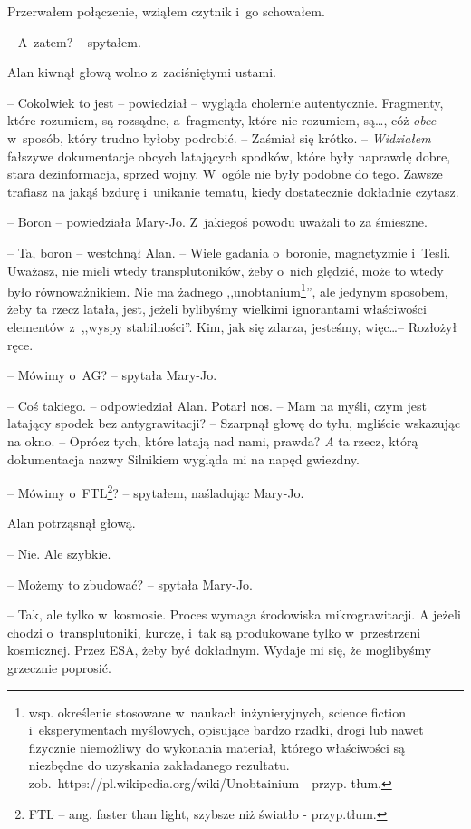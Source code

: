 \documentclass[oneside,polish,12pt,sfheadings]{mwbk}
\begin{document}
Przerwałem połączenie, wziąłem czytnik i~go schowałem.

-- A~zatem? -- spytałem.

Alan kiwnął głową wolno z~zaciśniętymi ustami.

-- Cokolwiek to jest -- powiedział -- wygląda cholernie autentycznie.
Fragmenty, które rozumiem, są rozsądne, a~fragmenty, które nie rozumiem,
są\ldots, cóż \emph{obce} w~sposób, który trudno byłoby podrobić. -- Zaśmiał
się krótko. -- \emph{Widziałem} fałszywe dokumentacje obcych latających
spodków, które były naprawdę dobre, stara dezinformacja, sprzed wojny. W~ogóle nie były podobne do tego. Zawsze trafiasz na jakąś bzdurę i~unikanie tematu, kiedy dostatecznie dokładnie czytasz.

-- Boron -- powiedziała Mary-Jo. Z~jakiegoś powodu uważali to za śmieszne.

-- Ta, boron -- westchnął Alan. -- Wiele gadania o~boronie, magnetyzmie i~Tesli. Uważasz, nie mieli wtedy transplutoników, żeby o~nich ględzić,
może to wtedy było równoważnikiem. Nie ma żadnego
,,unobtanium\footnote{wsp. określenie stosowane w~naukach
inżynieryjnych, science fiction i~eksperymentach myślowych, opisujące
bardzo rzadki, drogi lub nawet fizycznie niemożliwy do wykonania
materiał, którego właściwości są niezbędne do uzyskania zakładanego
rezultatu. zob.~https://pl.wikipedia.org/wiki/Unobtainium - przyp.
tłum.}'', ale jedynym sposobem, żeby ta rzecz latała, jest, jeżeli
bylibyśmy wielkimi ignorantami właściwości elementów z~,,wyspy
stabilności''. Kim, jak się zdarza, jesteśmy, więc\ldots -- Rozłożył ręce.

-- Mówimy o~AG? -- spytała Mary-Jo.

-- Coś takiego. -- odpowiedział Alan. Potarł nos. -- Mam na myśli, czym
jest latający spodek bez antygrawitacji? -- Szarpnął głowę do tyłu,
mgliście wskazując na okno. -- Oprócz tych, które latają nad nami,
prawda? \emph{A} ta rzecz, którą dokumentacja nazwy Silnikiem wygląda mi
na napęd gwiezdny.

-- Mówimy o~FTL\footnote{FTL -- ang. faster than light,
szybsze niż światło - przyp.tłum.}? -- spytałem, naśladując Mary-Jo.

Alan potrząsnął głową. 

-- Nie. Ale szybkie.

-- Możemy to zbudować? -- spytała Mary-Jo.

-- Tak, ale tylko w~kosmosie. Proces wymaga środowiska mikrograwitacji. A
jeżeli chodzi o~transplutoniki, kurczę, i~tak są produkowane tylko w~przestrzeni kosmicznej. Przez ESA, żeby być dokładnym. Wydaje mi się, że
moglibyśmy grzecznie poprosić.
\end{document}
